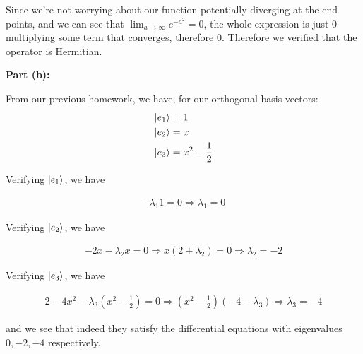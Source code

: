 \documentclass{article}
\numberwithin{equation}{section}
\begin{document}
Since we're not worrying about our function potentially diverging at the end points, and we can see that $\lim_{a \to \infty} e^{-a^2} = 0$, the whole expression is just $0$ multiplying some term that converges, therefore $0$. Therefore we verified that the operator is Hermitian.

\textbf{Part (b):}

From our previous homework, we have, for our orthogonal basis vectors: \begin{align}
    \ket{e_1} &= 1 \\
    \ket{e_2} &= x \\
    \ket{e_3} &= x^2 - \frac{1}{2}
\end{align}

Verifying $\ket{e_1}$, we have 

\begin{align}
    -\lambda_1 1 = 0 \Rightarrow \lambda_1 = 0
\end{align}

Verifying $\ket{e_2}$, we have

\begin{align}
    -2x - \lambda_2 x = 0 \Rightarrow x( 2 + \lambda_2) = 0 \Rightarrow \lambda_2 = -2
\end{align}

Verifying $\ket{e_3}$, we have

\begin{align}
    2 - 4x^2 - \lambda_3 (x^2 - \frac{1}{2}) = 0 \Rightarrow (x^2 - \frac{1}{2}) (-4 - \lambda_3) \Rightarrow \lambda_3 = -4
\end{align}

and we see that indeed they satisfy the differential equations with eigenvalues $0, -2, -4$ respectively.
\end{document}
